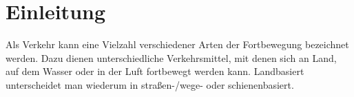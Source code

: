 \section{Einleitung}
\label{sec:einleitung}


Als Verkehr kann eine Vielzahl verschiedener Arten der Fortbewegung bezeichnet werden. 
Dazu dienen unterschiedliche Verkehrsmittel, mit denen sich an Land, auf dem Wasser oder in der Luft fortbewegt werden kann.
Landbasiert unterscheidet man wiederum in straßen-/wege- oder schienenbasiert.






 
%
%
%

